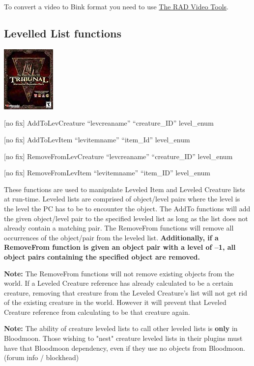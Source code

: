 To convert a video to Bink format you need to use
\href{http://www.radgametools.com/bnkdown.htm}{The RAD Video Tools}.

\hypertarget{levelled-list-functions}{%
\subsection{Levelled List functions}\label{levelled-list-functions}}

\includegraphics{media/image6.png}

{[}no fix{]} AddToLevCreature ``levcreaname'' ``creature\_ID''
level\_enum

{[}no fix{]} AddToLevItem ``levitemname'' ``item\_Id'' level\_enum

{[}no fix{]} RemoveFromLevCreature ``levcreaname'' ``creature\_ID''
level\_enum

{[}no fix{]} RemoveFromLevItem ``levitemname'' ``item\_ID'' level\_enum

These functions are used to manipulate Leveled Item and Leveled Creature
lists at run-time. Leveled lists are comprised of object/level pairs
where the level is the level the PC has to be to encounter the object.
The AddTo functions will add the given object/level pair to the
specified leveled list as long as the list does not already contain a
matching pair. The RemoveFrom functions will remove all occurrences of
the object/pair from the leveled list. \textbf{Additionally, if a
RemoveFrom function is given an object pair with a level of --1, all
object pairs containing the specified object are removed.}

\textbf{Note:} The RemoveFrom functions will not remove existing objects
from the world. If a Leveled Creature reference has already calculated
to be a certain creature, removing that creature from the Leveled
Creature's list will not get rid of the existing creature in the world.
However it will prevent that Leveled Creature reference from calculating
to be that creature again.

\textbf{Note:} The ability of creature leveled lists to call other
leveled lists is \textbf{only} in Bloodmoon. Those wishing to "nest"
creature leveled lists in their plugins must have that Bloodmoon
dependency, even if they use no objects from Bloodmoon. (forum info /
blockhead)

